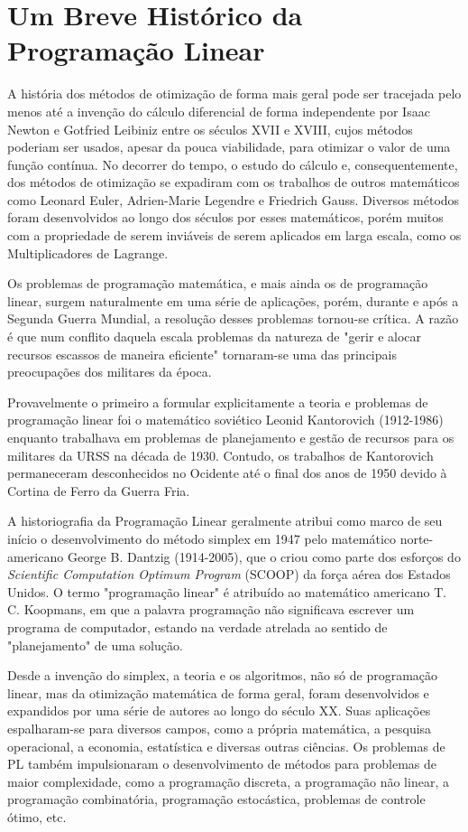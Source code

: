 \section{Um Breve Histórico da Programação Linear}

A história dos métodos de otimização de forma mais geral pode ser tracejada pelo
menos até a invenção do cálculo diferencial de forma independente por Isaac
Newton e Gotfried Leibiniz entre os séculos XVII e XVIII, cujos métodos poderiam ser usados,
apesar da pouca viabilidade, para otimizar o valor de uma função contínua. No decorrer
do tempo, o estudo do cálculo e, consequentemente, dos métodos de otimização se
expadiram com os trabalhos de outros matemáticos como Leonard Euler, Adrien-Marie
Legendre e Friedrich Gauss.
Diversos métodos foram desenvolvidos ao longo dos séculos por esses matemáticos,
porém muitos com a propriedade de serem inviáveis de serem aplicados em larga
escala, como os Multiplicadores de Lagrange.

Os problemas de programação matemática, e mais ainda os de programação linear,
surgem naturalmente em uma série de aplicações, porém,
durante e após a Segunda Guerra Mundial, a resolução desses problemas
tornou-se crítica. A razão é que num conflito daquela escala
problemas da natureza de "gerir e alocar recursos
escassos de maneira eficiente" tornaram-se uma das principais preocupações dos
militares da época.

Provavelmente o primeiro a formular explicitamente a teoria e problemas de
programação linear foi o matemático soviético Leonid Kantorovich (1912-1986)
enquanto trabalhava em
problemas de planejamento e gestão de recursos para os militares da URSS na
década de 1930. Contudo, os trabalhos de Kantorovich permaneceram desconhecidos
no Ocidente até o final
dos anos de 1950 devido à Cortina de Ferro da Guerra Fria.

A historiografia da Programação Linear geralmente atribui como marco de seu início o
desenvolvimento do método simplex em 1947 pelo matemático norte-americano
George B. Dantzig (1914-2005), que o criou como parte dos esforços do
\textit{Scientific Computation Optimum Program} (SCOOP) da força aérea dos
Estados Unidos. O termo "programação linear" é atribuído ao matemático
americano T. C. Koopmans, em que a palavra programação não significava
escrever um programa de computador, estando na verdade atrelada ao sentido de
"planejamento" de uma solução.

Desde a invenção do simplex, a teoria e os algoritmos, não só de programação
linear, mas da otimização matemática de forma geral, foram desenvolvidos e
expandidos por uma série de autores ao longo do século XX. Suas aplicações
espalharam-se para diversos campos, como a própria matemática, a pesquisa
operacional, a economia, estatística e diversas outras ciências. Os problemas
de PL também impulsionaram o desenvolvimento de métodos para problemas de maior
complexidade, como a programação discreta, a programação não linear, a
programação combinatória, programação estocástica, problemas de controle ótimo,
etc.
